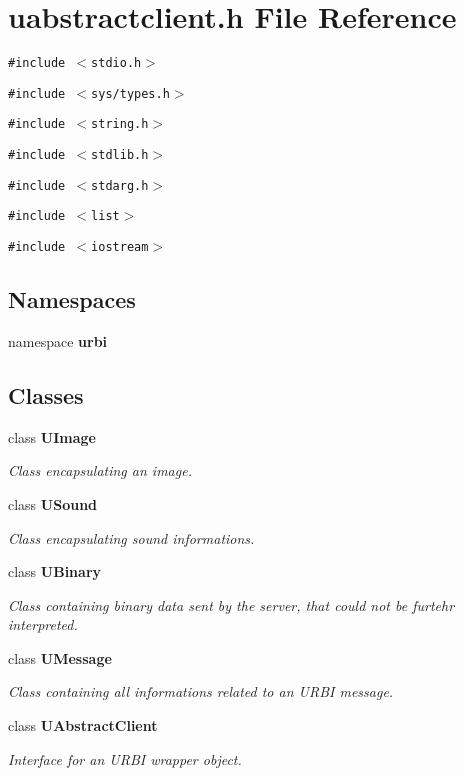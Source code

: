 \section{uabstractclient.h File Reference}
\label{uabstractclient_8h}
{\tt \#include $<$stdio.h$>$}\par
{\tt \#include $<$sys/types.h$>$}\par
{\tt \#include $<$string.h$>$}\par
{\tt \#include $<$stdlib.h$>$}\par
{\tt \#include $<$stdarg.h$>$}\par
{\tt \#include $<$list$>$}\par
{\tt \#include $<$iostream$>$}\par
\subsection*{Namespaces}
\begin{CompactItemize}
\item 
namespace {\bf urbi}
\end{CompactItemize}
\subsection*{Classes}
\begin{CompactItemize}
\item 
class {\bf UImage}
\begin{CompactList}\small\item\em Class encapsulating an image. \item\end{CompactList}\item 
class {\bf USound}
\begin{CompactList}\small\item\em Class encapsulating sound informations. \item\end{CompactList}\item 
class {\bf UBinary}
\begin{CompactList}\small\item\em Class containing binary data sent by the server, that could not be furtehr interpreted. \item\end{CompactList}\item 
class {\bf UMessage}
\begin{CompactList}\small\item\em Class containing all informations related to an URBI message. \item\end{CompactList}\item 
class {\bf UAbstract\-Client}
\begin{CompactList}\small\item\em Interface for an URBI wrapper object. \item\end{CompactList}\end{CompactItemize}

